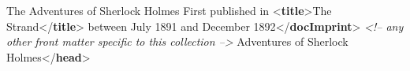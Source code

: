 \begin{shaded}
\hspace*{1em}\hspace*{1em} The Adventures of Sherlock Holmes\mbox{}\newline 
\hspace*{1em}\hspace*{1em}\mbox{}\newline 
\hspace*{1em}\mbox{}\newline 
\hspace*{1em}First published in {<\textbf{title}>}The Strand{</\textbf{title}>}\mbox{}\newline 
\hspace*{1em}\hspace*{1em}\hspace*{1em}\hspace*{1em} between July 1891 and December 1892{</\textbf{docImprint}>}\mbox{}\newline 
\textit{<!-- any other front matter specific to this collection -->}\mbox{}\newline 
{}\mbox{}\newline 
{}\mbox{}\newline 
\hspace*{1em}\mbox{}\newline 
\hspace*{1em}\hspace*{1em}\mbox{}\newline 
\hspace*{1em}\hspace*{1em}\hspace*{1em}Adventures of Sherlock\mbox{}\newline 
\hspace*{1em}\hspace*{1em}\hspace*{1em}\hspace*{1em}\hspace*{1em}\hspace*{1em}\hspace*{1em}\hspace*{1em} Holmes{</\textbf{head}>}\mbox{}\newline 

\end{shaded}
